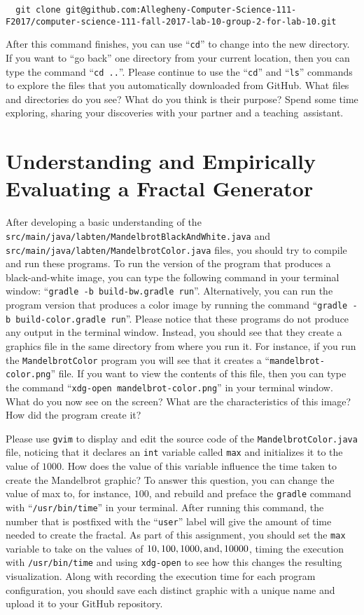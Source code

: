 \documentclass[11pt]{article}
\newcommand{\mainprogramsource}{\lstinline{src/main/java/labten/MandelbrotBlackAndWhite.java}}
\newcommand{\secondprogram}{\lstinline{MandelbrotColor}}
\newcommand{\secondprogramsource}{\lstinline{src/main/java/labten/MandelbrotColor.java}}
\newcommand{\command}[1]{``\lstinline{#1}''}
\newcommand{\program}[1]{\lstinline{#1}}
\newcommand{\step}[1]{``{#1}''}
\begin{document}
\begin{lstlisting}
  git clone git@github.com:Allegheny-Computer-Science-111-F2017/computer-science-111-fall-2017-lab-10-group-2-for-lab-10.git
\end{lstlisting}

After this command finishes, you can use \command{cd} to change into the new directory. If you want to \step{go back}
one directory from your current location, then you can type the command \command{cd ..}. Please continue to use the
\command{cd} and \command{ls} commands to explore the files that you automatically downloaded from GitHub. What files
and directories do you see? What do you think is their purpose? Spend some time exploring, sharing your discoveries with
your partner and a \mbox{teaching assistant}.

\section*{Understanding and Empirically Evaluating a Fractal Generator}

After developing a basic understanding of the \mainprogramsource{} and \secondprogramsource{} files, you should try to
compile and run these programs. To run the version of the program that produces a black-and-white image, you can type
the following command in your terminal window: \command{gradle -b build-bw.gradle run}. Alternatively, you can run the
program version that produces a color image by running the command \command{gradle -b build-color.gradle run}. Please
notice that these programs do not produce any output in the terminal window. Instead, you should see that they create a
graphics file in the same directory from where you run it. For instance, if you run the \secondprogram{} program you
will see that it creates a \command{mandelbrot-color.png} file. If you want to view the contents of this file, then you
can type the command \command{xdg-open mandelbrot-color.png} in your terminal window. What do you now see on the screen?
What are the characteristics of this image? How did the program create it?

Please use {\tt gvim} to display and edit the source code of the {\tt MandelbrotColor.java} file, noticing that it
declares an {\tt int} variable called {\tt max} and initializes it to the value of $1000$. How does the value of this
variable influence the time taken to create the Mandelbrot graphic? To answer this question, you can change the value of
max to, for instance, $100$, and rebuild and preface the \program{gradle} command with ``{\tt /usr/bin/time}'' in your
terminal. After running this command, the number that is postfixed with the ``{\tt user}'' label will give the amount of
time needed to create the fractal. As part of this assignment, you should set the {\tt max} variable to take on the
values of $10, 100, 1000, \mbox{and}, \- 10000$, timing the execution with {\tt /usr/bin/time} and using {\tt xdg-open}
to see how this changes the resulting visualization. Along with recording the execution time for each program
configuration, you should save each distinct graphic with a unique name and upload it to your GitHub repository.
\end{document}

